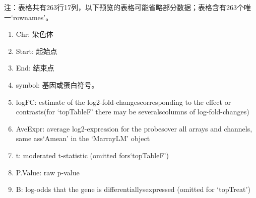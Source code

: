 \documentclass[
]{article}
\providecommand{\tightlist}{%
  \setlength{\itemsep}{0pt}\setlength{\parskip}{0pt}}
\begin{document}
\begin{center}\begin{tcolorbox}[colback=gray!10, colframe=gray!50, width=0.9\linewidth, arc=1mm, boxrule=0.5pt]注：表格共有263行17列，以下预览的表格可能省略部分数据；表格含有263个唯一`rownames'。
\end{tcolorbox}
\end{center}
\begin{center}\begin{tcolorbox}[colback=gray!10, colframe=gray!50, width=0.9\linewidth, arc=1mm, boxrule=0.5pt]\begin{enumerate}\tightlist
\item Chr: 染色体
\item Start: 起始点
\item End: 结束点
\item symbol: 基因或蛋白符号。
\item logFC: estimate of the log2-fold-changescorresponding to the effect or contrasts(for ‘topTableF’ there may be severalscolumns of log-fold-changes)
\item AveExpr: average log2-expression for the probesover all arrays and channels, same ass‘Amean’ in the ‘MarrayLM’ object
\item t: moderated t-statistic (omitted fors‘topTableF’)
\item P.Value: raw p-value
\item B: log-odds that the gene is differentiallysexpressed (omitted for ‘topTreat’)
\end{enumerate}\end{tcolorbox}
\end{center}
\end{document}
